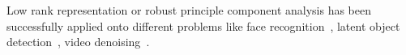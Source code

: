 Low rank representation or robust principle component analysis has been successfully applied onto different problems like face recognition~\cite{ma2012sparse}, latent object detection~\cite{shen2012unified}, video denoising~\cite{ji2010robust}.

